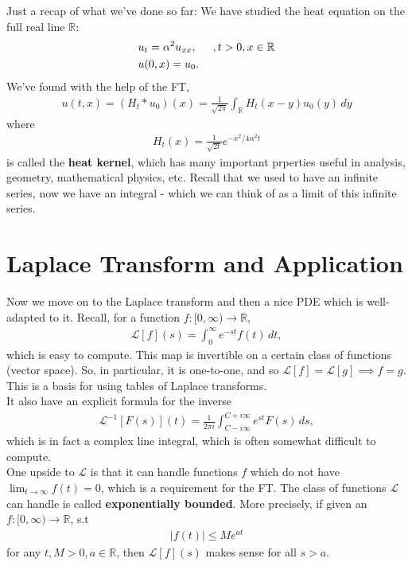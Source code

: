 \documentclass{book}
\theoremstyle{definition}
\newcommand{\R}{\mathbb{R}}
\newcommand{\lag}{\mathcal{L}}
\newcommand{\al}{\alpha}
\newcommand{\f}[2]{\frac{#1}{#2}}
\newcommand{\ift}{\infty}
\begin{document}
Just a recap of what we've done so far: We have studied the heat equation on the full real line $\R$:
\begin{align*}
&u_t = \al^2 u_{xx}, \hspace{0.5cm}, t>0, x\in \R\\
&u(0,x) = u_0.
\end{align*}
We've found with the help of the FT, 
\begin{align*}
u(t,x) = (H_t \ast u_0)(x) = \f{1}{\sqrt{2\pi}}\int_\R H_t(x-y)u_0(y)\,dy
\end{align*}
where
\begin{align*}
H_t(x) = \f{1}{\sqrt{2t}} e^{-x^2/4\al^2 t}
\end{align*}
is called the \textbf{heat kernel}, which has many important prperties useful in analysis, geometry, mathematical physics, etc. Recall that we used to have an infinite series, now we have an integral - which we can think of as a limit of this infinite series.

\newpage

\chapter{Laplace Transform and Application}

Now we move on to the Laplace transform and then a nice PDE which is well-adapted to it. Recall, for a function $f : [0,\ift) \to \R$,
\begin{align*}
\lag[f](s) = \int_0^\infty e^{-st}f(t)\,dt,
\end{align*}
which is easy to compute. This map is invertible on a certain class of functions (vector space). So, in particular, it is one-to-one, and so $\lag[f] = \lag[g] \implies f=g$. This is a basis for using tables of Laplace transforms.\\

It also have an explicit formula for the inverse
\begin{align*}
\lag^{-1}[F(s)](t) = \f{1}{2\pi i}\int_{C-i\infty}^{C+ i\infty}e^{st}F(s)\,ds,
\end{align*}
which is in fact a complex line integral, which is often somewhat difficult to compute. \\

One upside to $\lag$ is that it can handle functions $f$ which do not have $\lim_{t\to \ift} f(t) = 0$, which is a requirement for the FT. The class of functions $\lag$ can handle is called \textbf{exponentially bounded}. More precisely, if given an $f : [0,\ift) \to \R$, s.t 
\begin{align*}
\vert f(t) \vert \leq Me^{at}
\end{align*}
for any $t, M > 0, a\in\R$, then $\lag[f](s)$ makes sense for all $s>a$.\\
\end{document}
